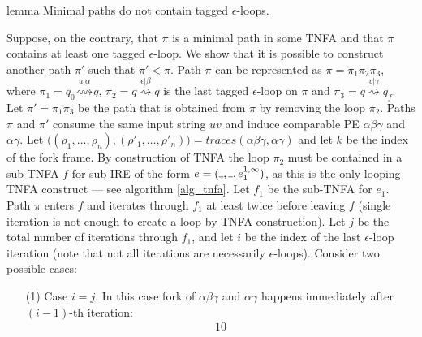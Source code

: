 \documentclass[AMA,STIX1COL]{WileyNJD-v2}
\newcommand{\Xl}{\langle}
\newcommand{\Xr}{\rangle}
\newcommand{\Xund}{\rule{.4em}{.4pt}}
\begin{document}
\begin{theoremEnd}[restate, no link to proof, no link to theorem, category=lemmata_closure]{lemma}
    \label{lemma_closure_minpaths}
    Minimal paths do not contain tagged $\epsilon$-loops.
\end{theoremEnd}
\begin{proofEnd}
    Suppose, on the contrary, that $\pi$ is a minimal path in some TNFA
    and that $\pi$ contains at least one tagged $\epsilon$-loop.
    We show that it is possible to construct another path $\pi'$ such that $\pi' < \pi$.
    Path $\pi$ can be represented as
    $\pi = \pi_1 \pi_2 \pi_3$, where
    $\pi_1 = q_0 \overset {u | \alpha} {\rightsquigarrow} q$,
    $\pi_2 = q \overset {\epsilon | \beta} {\rightsquigarrow} q$ is the last tagged $\epsilon$-loop on $\pi$ and
    $\pi_3 = q \overset {v | \gamma} {\rightsquigarrow} q_f$.
    Let $\pi' = \pi_1 \pi_3$ be the path that is obtained from $\pi$ by removing the loop $\pi_2$.
    Paths $\pi$ and $\pi'$ consume the same input string $uv$
    and induce comparable PE $\alpha \beta \gamma$ and $\alpha \gamma$.
    Let $\big( (\rho_1, \hdots, \rho_n), (\rho'_1, \hdots, \rho'_n) \big) = traces (\alpha \beta \gamma, \alpha \gamma)$
    and let $k$ be the index of the fork frame.
    By construction of TNFA the loop $\pi_2$ must be contained in a sub-TNFA $f$
    for sub-IRE of the form $e = (\Xund, \Xund, e_1^{1,\infty})$,
    as this is the only looping TNFA construct --- see algorithm \ref{alg_tnfa}.
    Let $f_1$ be the sub-TNFA for $e_1$.
    Path $\pi$ enters $f$ and iterates through $f_1$ at least twice before leaving $f$
    (single iteration is not enough to create a loop by TNFA construction).
    Let $j$ be the total number of iterations through $f_1$,
    and let $i$ be the index of the last $\epsilon$-loop iteration
    (note that not all iterations are necessarily $\epsilon$-loops).
    Consider two possible cases:
    \begin{enumerate}[itemsep=0.5em, topsep=0.5em]
    \item[(1)]
        Case $i = j$.
        In this case fork of $\alpha \beta \gamma$ and $\alpha \gamma$ happens immediately after $(i-1)$-th iteration:
        \begin{alignat*}{10}

\end{alignat*}
\end{enumerate}
\end{proofEnd}
\end{document}
